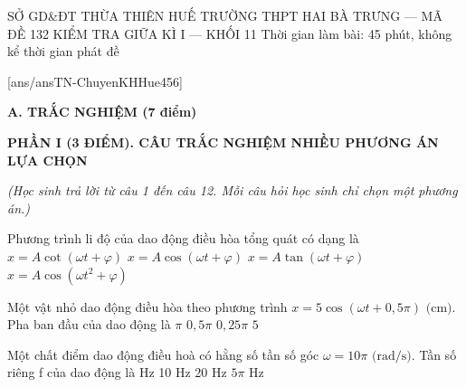 \def\toanlop{11}
\def\thoigian{45}
\def\namhoc{2024 - 2025}
\begin{dethi}
	{SỞ GD\&ĐT THỪA THIÊN HUẾ}
	{TRƯỜNG THPT HAI BÀ TRƯNG --- MÃ ĐỀ 132}
	{KIỂM TRA GIỮA KÌ I --- KHỐI 11}
	{Thời gian làm bài: 45 phút, không kể thời gian phát đề}
\end{dethi}

[ans/ansTN-ChuyenKHHue456]

\noindent \textbf{A. TRẮC NGHIỆM (7 điểm)}

\noindent \textbf{PHẦN I (3 ĐIỂM). CÂU TRẮC NGHIỆM NHIỀU PHƯƠNG ÁN LỰA CHỌN}

\noindent \textit{(Học sinh trả lời từ câu 1 đến câu 12. Mỗi câu hỏi học sinh chỉ chọn một phương án.)}
\vspace{0.2cm}

\begin{ex}%
	Phương trình li độ của dao động điều hòa tổng quát có dạng là
	\choice
	{$x=A \cot (\omega t+\varphi)$}
	{\True $x=A \cos (\omega t+\varphi)$}
	{$x=A \tan (\omega t+\varphi)$}
	{$x=A \cos \left(\omega t^{2}+\varphi\right)$}
\end{ex}

\begin{ex}%
	Một vật nhỏ dao động điều hòa theo phương trình $x=5 \cos (\omega t+0,5 \pi)\text{ (cm)}$. Pha ban đầu của dao động là
	\choice
	{$\pi$}
	{\True $0,5 \pi$}
	{$0,25 \pi$}
	{$5$}
\end{ex}

\begin{ex}%
	Một chất điểm dao động điều hoà có hằng số tần số góc $\omega=10 \pi\text{ (rad/s)}$. Tần số riêng f của dao động là
	\choice
	{ Hz}
	{10 Hz}
	{20 Hz}
	{$5\pi\text{ Hz}$}
\end{ex}

